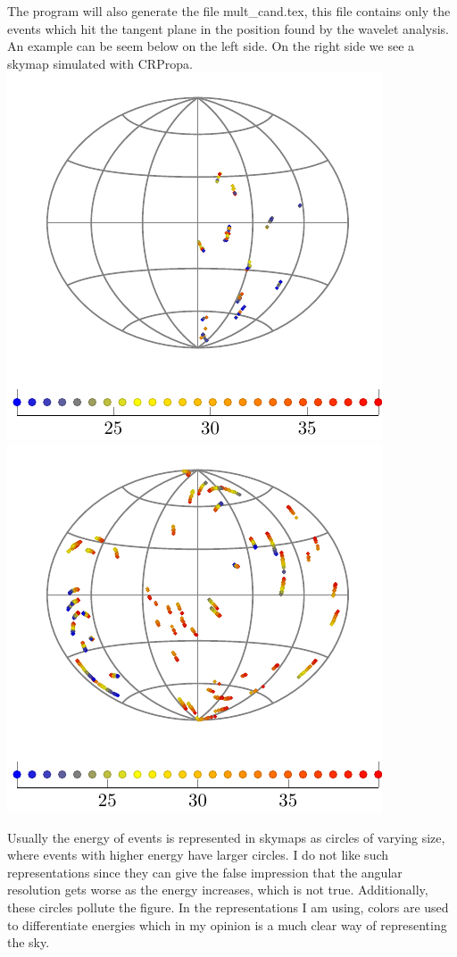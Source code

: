 \documentclass[12pt]{article}
\begin{document}
The program will also generate the file mult\_cand.tex, this file contains only
the events which hit the tangent plane in the position found by the wavelet
analysis. An example can be seem below on the left side. On the right side we
see a skymap simulated with CRPropa. \\
\includegraphics[scale=1.0]{fig/mult-cand.pdf} 
\includegraphics[scale=1.0]{fig/crpropa.pdf}

Usually the energy of events is represented in skymaps as circles of varying
size, where events with higher energy have larger circles. I do not like such
representations since they can give the false impression that the angular
resolution gets worse as the energy increases, which is not true. Additionally,
these circles pollute the figure. In the representations I am using, colors
are used to differentiate energies which in my opinion is a much clear way of
representing the sky.
\end{document}
